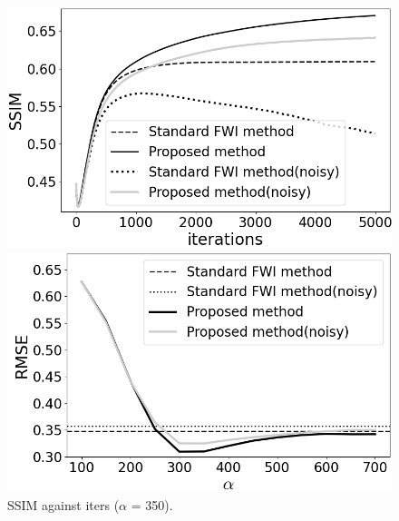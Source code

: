 \begin{figure}[htbp]
    \centering
    \hspace{-3mm}
    \begin{minipage}{58mm}
        \centering
        \includegraphics[width=\linewidth]{public/iters-ssim-all}
        \caption{SSIM against iters ($\alpha$ = 350).}
        \label{fig:iters-ssim-noisy}
    \end{minipage}
    \hspace{-1mm}
    \begin{minipage}{58mm}
        \centering
        \includegraphics[width=\linewidth]{public/alpha-rmse}

\end{minipage}
\end{figure}
